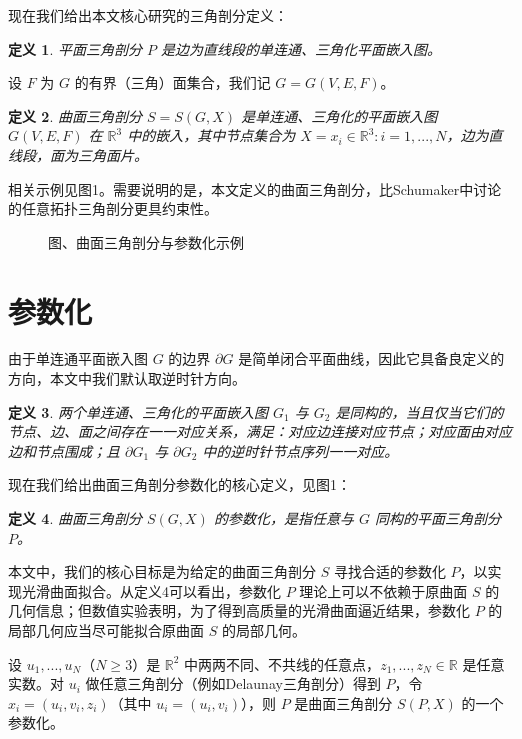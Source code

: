\documentclass{ctexart}
\newtheorem{definition}{定义}
\theoremstyle{proof}
\begin{document}
现在我们给出本文核心研究的三角剖分定义：

\begin{definition}
平面三角剖分 $P$ 是边为直线段的单连通、三角化平面嵌入图。
\end{definition}

设 $F$ 为 $G$ 的有界（三角）面集合，我们记 $G=G(V, E, F)$。

\begin{definition}
曲面三角剖分 $S=S(G, X)$ 是单连通、三角化的平面嵌入图 $G(V, E, F)$ 在 $\mathbb{R}^3$ 中的嵌入，其中节点集合为 $X={x_{i} \in \mathbb{R}^{3}: i=1, ..., N}$，边为直线段，面为三角面片。
\end{definition}

相关示例见图1。需要说明的是，本文定义的曲面三角剖分，比Schumaker\cite{schumaker1993}中讨论的任意拓扑三角剖分更具约束性。

\begin{figure}[htbp]
    \centering
    \caption{图、曲面三角剖分与参数化示例}
    \label{fig:1}
\end{figure}

\section{参数化}
由于单连通平面嵌入图 $G$ 的边界 $\partial G$ 是简单闭合平面曲线，因此它具备良定义的方向，本文中我们默认取逆时针方向。

\begin{definition}
两个单连通、三角化的平面嵌入图 $G_1$ 与 $G_2$ 是同构的，当且仅当它们的节点、边、面之间存在一一对应关系，满足：对应边连接对应节点；对应面由对应边和节点围成；且 $\partial G_1$ 与 $\partial G_2$ 中的逆时针节点序列一一对应。
\end{definition}

现在我们给出曲面三角剖分参数化的核心定义，见图1：

\begin{definition}
曲面三角剖分 $S(G, X)$ 的参数化，是指任意与 $G$ 同构的平面三角剖分 $P$。
\end{definition}

本文中，我们的核心目标是为给定的曲面三角剖分 $S$ 寻找合适的参数化 $P$，以实现光滑曲面拟合。从定义4可以看出，参数化 $P$ 理论上可以不依赖于原曲面 $S$ 的几何信息；但数值实验表明，为了得到高质量的光滑曲面逼近结果，参数化 $P$ 的局部几何应当尽可能拟合原曲面 $S$ 的局部几何。

\begin{example}
设 $u_{1}, ..., u_{N}$（$N ≥3$）是 $\mathbb{R}^2$ 中两两不同、不共线的任意点，$z_{1}, ..., z_{N} \in \mathbb{R}$ 是任意实数。对 $u_i$ 做任意三角剖分（例如Delaunay三角剖分\cite{preparata1985,schumaker1987}）得到 $P$，令 $x_{i}=(u_{i}, v_{i}, z_{i})$（其中 $u_i=(u_i,v_i)$），则 $P$ 是曲面三角剖分 $S(P, X)$ 的一个参数化。
\end{example}
\end{document}
